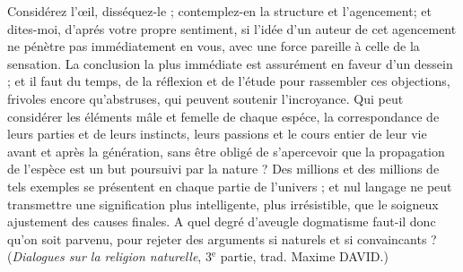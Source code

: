 Considérez l’{\oe}il, disséquez-le ; contemplez-en la structure
et l'agencement; et dites-moi, d’aprés votre propre
sentiment, si l'idée d’un auteur de cet agencement ne
pénètre pas immédiatement en vous, avec une force
pareille à celle de la sensation. La conclusion la plus immédiate
est assurément en faveur d’un dessein ; et il faut du
temps, de la réflexion et de l’étude pour rassembler ces
objections, frivoles encore qu’abstruses, qui peuvent
soutenir l'incroyance. Qui peut considérer les éléments
mâle et femelle de chaque espéce, la correspondance de
leurs parties et de leurs instincts, leurs passions et le
cours entier de leur vie avant et après la génération,
sans être obligé de s’apercevoir que la propagation de
l'espèce est un but poursuivi par la nature ? Des millions
et des millions de tels exemples se présentent en chaque
partie de l'univers ; et nul langage ne peut transmettre
une signification plus intelligente, plus irrésistible, que
le soigneux ajustement des causes finales. A quel degré
d’aveugle dogmatisme faut-il donc qu’on soit parvenu,
pour rejeter des arguments si naturels et si convaincants ?
({\it Dialogues sur la religion naturelle}, 3$^\text{e}$ partie, trad. Maxime
D{\footnotesize AVID}.)
